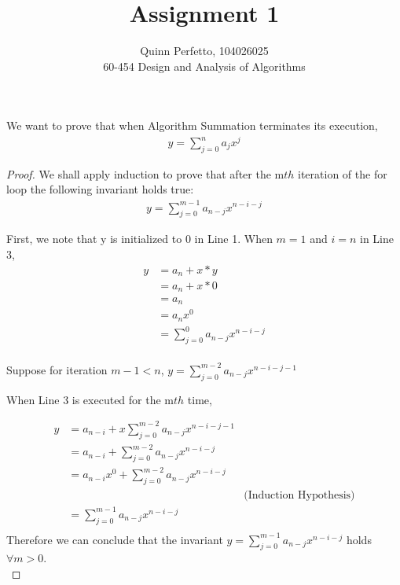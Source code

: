 \documentclass[12pt]{article}
\newenvironment{question}[2][Question]{\begin{trivlist}
\item[\hskip \labelsep {\bfseries #1}\hskip \labelsep {\bfseries #2.}]}{\end{trivlist}}
\begin{document}
\title{Assignment 1}%
\author{Quinn Perfetto, 104026025\\ %
 60-454 Design and Analysis of Algorithms} %

\maketitle

\begin{question}{1 (i)}
  We want to prove that when Algorithm Summation terminates its execution,
  \begin{align*}
    \texttt{$y = \sum_{j=0}^{n} a_{j}x^{j}$}
  \end{align*}
  \begin{proof}
    We shall apply induction to prove that after the m$th$ iteration of the
    for loop the following invariant holds true:
    \begin{align*}
      \texttt{$y = \sum_{j=0}^{m - 1} a_{n - j}x^{n - i - j}$}
    \end{align*}

    First, we note that y is initialized to 0 in Line 1. When $m=1$ and $i=n$
    in Line 3,
    \begin{align*}
      y & = a_{n} + x * y\\
        & = a_{n} + x * 0\\
        & = a_{n}\\
        & = a_{n}x^{0}\\
        & = \sum_{j=0}^{0} a_{n - j}x^{n - i - j}\\
    \end{align*}

    Suppose for iteration $m - 1 < n$,
    $y = \sum_{j=0}^{m-2} a_{n - j}x^{n - i - j - 1}$

    When Line 3 is executed for the m$th$ time,

    \begin{align*}
      y & = a_{n - i} + x\sum_{j=0}^{m-2} a_{n - j}x^{n - i - j - 1}\\
        & = a_{n - i} + \sum_{j=0}^{m-2} a_{n - j}x^{n - i - j} \\
        & = a_{n - i}x^{0} + \sum_{j=0}^{m-2} a_{n - j}x^{n - i - j}\\
        & & \text{(Induction Hypothesis)}\\
        & = \sum_{j=0}^{m-1} a_{n-j}x^{n - i - j}\\
    \end{align*}
    Therefore we can conclude that the invariant
    \texttt{$y = \sum_{j=0}^{m - 1} a_{n - j}x^{n - i - j}$} holds $\forall m > 0$. \\



\end{proof}
\end{question}
\end{document}

